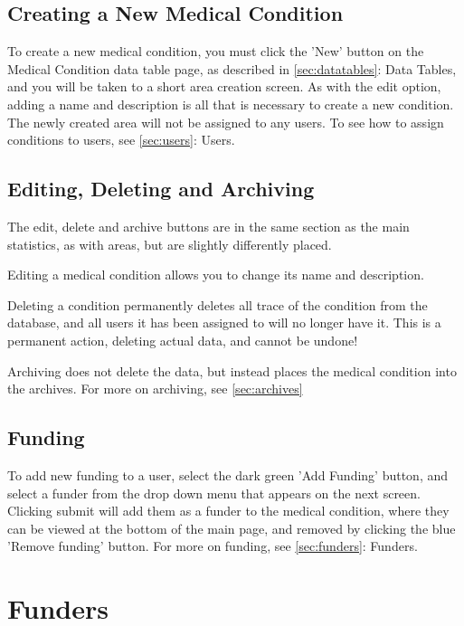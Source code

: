 \documentclass{bhcguides}
\begin{document}
\pagebreak

\subsection{Creating a New Medical Condition}
\label{ssec:createmedical}

To create a new medical condition, you must click the 'New' button on the Medical Condition data table page, as described in \autoref{sec:datatables}: Data Tables, and you will be taken to a short area creation screen. As with the edit option, adding a name and description is all that is necessary to create a new condition. The newly created area will not be assigned to any users. To see how to assign conditions to users, see \autoref{sec:users}: Users.

\subsection{Editing, Deleting and Archiving}
\label{ssec:mededitdelete}

The edit, delete and archive buttons are in the same section as the main statistics, as with areas, but are slightly differently placed.

Editing a medical condition allows you to change its name and description.

Deleting a condition permanently deletes all trace of the condition from the database, and all users it has been assigned to will no longer have it. This is a permanent action, deleting actual data, and cannot be undone!

Archiving does not delete the data, but instead places the medical condition into the archives. For more on archiving, see \autoref{sec:archives}


\subsection{Funding}
\label{ssec:medenrolfund}

To add new funding to a user, select the dark green 'Add Funding' button, and select a funder from the drop down menu that appears on the next screen. Clicking submit will add them as a funder to the medical condition, where they can be viewed at the bottom of the main page, and removed by clicking the blue 'Remove funding' button. For more on funding, see \autoref{sec:funders}: Funders.

\pagebreak

\section{Funders}
\label{sec:funders}
\end{document}
